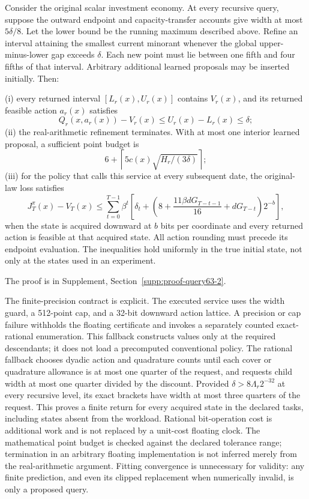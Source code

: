 \begin{theorem}\label{thm:query63}
Consider the original scalar investment economy. At every recursive query, suppose the outward endpoint and capacity-transfer accounts give width at most $5\delta/8$. Let the lower bound be the running maximum described above. Refine an interval attaining the smallest current minorant whenever the global upper-minus-lower gap exceeds $\delta$. Each new point must lie between one fifth and four fifths of that interval. Arbitrary additional learned proposals may be inserted initially. Then:

(i) every returned interval $[L_r(x),U_r(x)]$ contains $V_r(x)$, and its returned feasible action $a_r(x)$ satisfies
\[
 Q_r(x,a_r(x))-V_r(x)\le U_r(x)-L_r(x)\le\delta;
\]
(ii) the real-arithmetic refinement terminates. With at most one interior learned proposal, a sufficient point budget is
\begin{equation}\label{eq:querycap63}
 6+\left\lceil5c(x)\sqrt{H_r/(3\delta)}\right\rceil;
\end{equation}
(iii) for the policy that calls this service at every subsequent date, the original-law loss satisfies
\begin{equation}\label{eq:querypolicy63}
 J_T^{\pi}(x)-V_T(x)
 \le\sum_{t=0}^{T-1}\beta^t
 \left[\delta_t+
 \left(8+\frac{11\beta dG_{T-t-1}}{16}
                  +dG_{T-t}\right)2^{-b}\right],
\end{equation}
when the state is acquired downward at $b$ bits per coordinate and every returned action is feasible at that acquired state. All action rounding must precede its endpoint evaluation. The inequalities hold uniformly in the true initial state, not only at the states used in an experiment.
\end{theorem}
\noindent The proof is in Supplement, Section~\ref{supp:proof-query63-2}.


The finite-precision contract is explicit. The executed service uses the width guard, a 512-point cap, and a 32-bit downward action lattice. A precision or cap failure withholds the floating certificate and invokes a separately counted exact-rational enumeration. This fallback constructs values only at the required descendants; it does not load a precomputed conventional policy. The rational fallback chooses dyadic action and quadrature counts until each cover or quadrature allowance is at most one quarter of the request, and requests child width at most one quarter divided by the discount. Provided $\delta>8\Lambda_r2^{-32}$ at every recursive level, its exact brackets have width at most three quarters of the request. This proves a finite return for every acquired state in the declared tasks, including states absent from the workload. Rational bit-operation cost is additional work and is not replaced by a unit-cost floating clock. The mathematical point budget is checked against the declared tolerance range; termination in an arbitrary floating implementation is not inferred merely from the real-arithmetic argument. Fitting convergence is unnecessary for validity: any finite prediction, and even its clipped replacement when numerically invalid, is only a proposed query.

